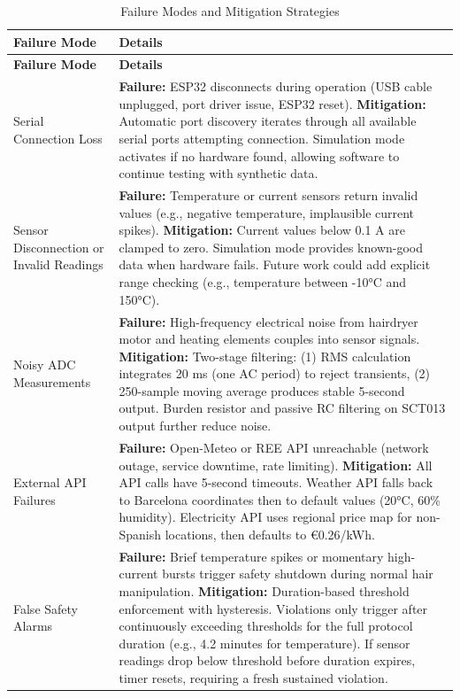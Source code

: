 \documentclass[11pt,a4paper]{article}
\begin{document}
\begin{longtable}{|p{}|p{}|}
\caption{Failure Modes and Mitigation Strategies}
\label{tab:failure_modes} \\
\hline
\textbf{Failure Mode} & \textbf{Details} \\
\hline
\endfirsthead
\hline
\textbf{Failure Mode} & \textbf{Details} \\
\hline
\endhead
\hline
\endfoot
\hline
\endlastfoot
Serial Connection Loss & \textbf{Failure:} ESP32 disconnects during operation (USB cable unplugged, port driver issue, ESP32 reset). \newline \textbf{Mitigation:} Automatic port discovery iterates through all available serial ports attempting connection. Simulation mode activates if no hardware found, allowing software to continue testing with synthetic data. \\
\hline
Sensor Disconnection or Invalid Readings & \textbf{Failure:} Temperature or current sensors return invalid values (e.g., negative temperature, implausible current spikes). \newline \textbf{Mitigation:} Current values below 0.1 A are clamped to zero. Simulation mode provides known-good data when hardware fails. Future work could add explicit range checking (e.g., temperature between -10°C and 150°C). \\
\hline
Noisy ADC Measurements & \textbf{Failure:} High-frequency electrical noise from hairdryer motor and heating elements couples into sensor signals. \newline \textbf{Mitigation:} Two-stage filtering: (1) RMS calculation integrates 20 ms (one AC period) to reject transients, (2) 250-sample moving average produces stable 5-second output. Burden resistor and passive RC filtering on SCT013 output further reduce noise. \\
\hline
External API Failures & \textbf{Failure:} Open-Meteo or REE API unreachable (network outage, service downtime, rate limiting). \newline \textbf{Mitigation:} All API calls have 5-second timeouts. Weather API falls back to Barcelona coordinates then to default values (20°C, 60\% humidity). Electricity API uses regional price map for non-Spanish locations, then defaults to €0.26/kWh. \\
\hline
False Safety Alarms & \textbf{Failure:} Brief temperature spikes or momentary high-current bursts trigger safety shutdown during normal hair manipulation. \newline \textbf{Mitigation:} Duration-based threshold enforcement with hysteresis. Violations only trigger after continuously exceeding thresholds for the full protocol duration (e.g., 4.2 minutes for temperature). If sensor readings drop below threshold before duration expires, timer resets, requiring a fresh sustained violation. \\

\end{longtable}
\end{document}
